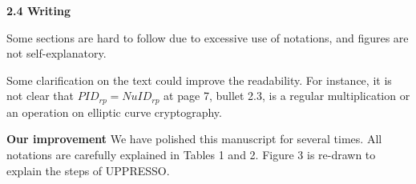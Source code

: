 \documentclass[letterpaper,onecolumn,10pt]{article}
\begin{document}
\vspace{1mm}\noindent\textbf{2.4 Writing}

Some sections are hard to follow due to excessive use of notations, and figures are not self-explanatory.

Some clarification on the text could improve the readability. For instance, it is not clear that $PID_{rp}= NuID_{rp}$ at page 7, bullet 2.3, is a regular multiplication or an operation on elliptic curve cryptography.

\vspace{1mm}\noindent\textbf{Our improvement}
We have polished this manuscript for several times.
All notations are carefully explained in Tables 1 and 2.
Figure 3 is re-drawn to explain the steps of UPPRESSO.
\end{document}
